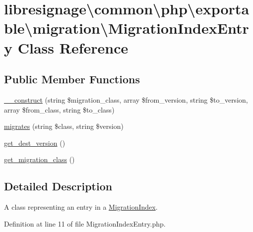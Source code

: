 \hypertarget{classlibresignage_1_1common_1_1php_1_1exportable_1_1migration_1_1MigrationIndexEntry}{}\section{libresignage\textbackslash{}common\textbackslash{}php\textbackslash{}exportable\textbackslash{}migration\textbackslash{}Migration\+Index\+Entry Class Reference}
\label{classlibresignage_1_1common_1_1php_1_1exportable_1_1migration_1_1MigrationIndexEntry}
\subsection*{Public Member Functions}
\begin{DoxyCompactItemize}
\item 
\hyperlink{classlibresignage_1_1common_1_1php_1_1exportable_1_1migration_1_1MigrationIndexEntry_aff20ed8d53a2777801233b63e01a4364}{\+\_\+\+\_\+construct} (string \$migration\+\_\+class, array \$from\+\_\+version, string \$to\+\_\+version, array \$from\+\_\+class, string \$to\+\_\+class)
\item 
\hyperlink{classlibresignage_1_1common_1_1php_1_1exportable_1_1migration_1_1MigrationIndexEntry_afae7a2b1d87620cdd3cc91bd4466d764}{migrates} (string \$class, string \$version)
\item 
\hyperlink{classlibresignage_1_1common_1_1php_1_1exportable_1_1migration_1_1MigrationIndexEntry_a65cb690b8b6633f38b82510e7bbc65c2}{get\+\_\+dest\+\_\+version} ()
\item 
\hyperlink{classlibresignage_1_1common_1_1php_1_1exportable_1_1migration_1_1MigrationIndexEntry_abefa345d631d57ae9079f91af4dc3e3e}{get\+\_\+migration\+\_\+class} ()
\end{DoxyCompactItemize}


\subsection{Detailed Description}
A class representing an entry in a \hyperlink{classlibresignage_1_1common_1_1php_1_1exportable_1_1migration_1_1MigrationIndex}{Migration\+Index}. 

Definition at line 11 of file Migration\+Index\+Entry.\+php.



